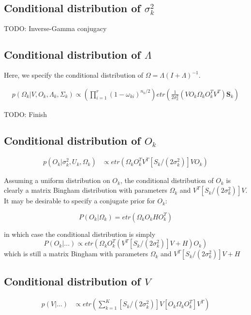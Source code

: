 \documentclass{article}
\begin{document}
\subsection*{Conditional distribution of $\sigma_k^2$}
TODO: Inverse-Gamma conjugacy

\subsection*{Conditional distribution of $\Lambda$}
Here, we specify the conditional distribution of $\Omega = \Lambda(I+\Lambda)^{-1}$.  

\begin{align}
p(\Omega_k|V,O_k,\Lambda_k,\Sigma_k) \propto \left(\prod_{i=1}^r(1-\omega_{ki})^{n_k/2}  \right) etr(\frac{1}{2\sigma_k^2}(VO_k\Omega_kO_k^TV^T)\mathbf{S}_k) 
\end{align}

TODO: Finish

\subsection*{Conditional distribution of $O_k$}

\begin{align}
\label{lik_vo}
 p(O_k | \sigma^2_k, U_k, \Omega_k) & \propto etr(\Omega_kO^T_kV^T[S_k/(2\sigma^2_k)]VO_k)
\end{align}

Assuming a uniform distribution on $O_k$, the conditional distribution of $O_k$ is clearly a matrix Bingham distribution with parameters $\Omega_k$ and $V^T[S_k/(2\sigma^2_k)]V$.  It may be desirable to specify a conjugate prior for $O_k$:

\begin{equation}
P(O_k|\Omega_k) = etr(\Omega_kO_kHO_k^T)
\end{equation}

in which case the conditional distribution is simply
\begin{equation}
P(O_k|...) \propto etr(\Omega_kO^T_k(V^T[S_k/(2\sigma^2_k)]V + H)O_k)
\end{equation}
which is still a matrix Bingham with parameters $\Omega_k$ and $V^T[S_k/(2\sigma^2_k)]V+H$
\subsection*{Conditional distribution of $V$}
\begin{align}
p(V|...) &\propto etr(\sum_{k=1}^K[S_k/(2\sigma^2_k)]V[O_k\Omega_kO^T_k]V^T)\\
\end{align}
\end{document}
